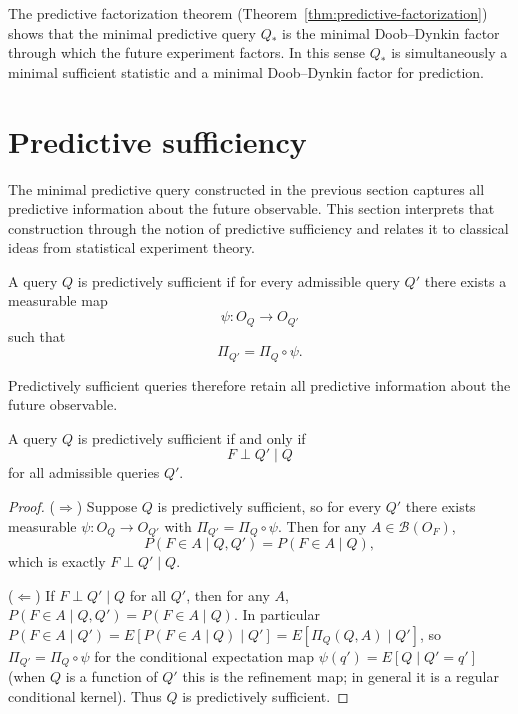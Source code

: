 \begin{remark}
The predictive factorization theorem (Theorem~\ref{thm:predictive-factorization})
shows that the minimal predictive query $Q_*$ is the minimal
Doob--Dynkin factor through which the future experiment factors.
In this sense $Q_*$ is simultaneously a minimal sufficient statistic
and a minimal Doob--Dynkin factor for prediction.
\end{remark}

\bigskip

\section{Predictive sufficiency}\label{sec:predictive-sufficiency}

The minimal predictive query constructed in the previous section
captures all predictive information about the future observable.
This section interprets that construction through the notion of
predictive sufficiency and relates it to classical ideas from
statistical experiment theory.

\begin{definition}
A query $Q$ is predictively sufficient if for every admissible query $Q'$
there exists a measurable map
\[
\psi:O_Q\to O_{Q'}
\]
such that
\[
\Pi_{Q'}=\Pi_Q\circ\psi.
\]
\end{definition}

Predictively sufficient queries therefore retain all predictive
information about the future observable.

\begin{theorem}
A query $Q$ is predictively sufficient if and only if
\[
F \perp Q' \mid Q
\]
for all admissible queries $Q'$.
\end{theorem}

\begin{proof}
($\Rightarrow$)
Suppose $Q$ is predictively sufficient, so for every $Q'$ there exists
measurable $\psi:O_Q\to O_{Q'}$ with $\Pi_{Q'}=\Pi_Q\circ\psi$.
Then for any $A\in\mathcal B(O_F)$,
\[
P(F\in A\mid Q,Q')
=
P(F\in A\mid Q),
\]
which is exactly $F\perp Q'\mid Q$.

($\Leftarrow$)
If $F\perp Q'\mid Q$ for all $Q'$, then for any $A$,
$P(F\in A\mid Q,Q')=P(F\in A\mid Q)$.
In particular $P(F\in A\mid Q')=E[P(F\in A\mid Q)\mid Q']
=E[\Pi_Q(Q,A)\mid Q']$,
so $\Pi_{Q'}=\Pi_Q\circ\psi$ for the conditional expectation map
$\psi(q')=E[Q\mid Q'=q']$ (when $Q$ is a function of $Q'$ this is the
refinement map; in general it is a regular conditional kernel).
Thus $Q$ is predictively sufficient.
\end{proof}

